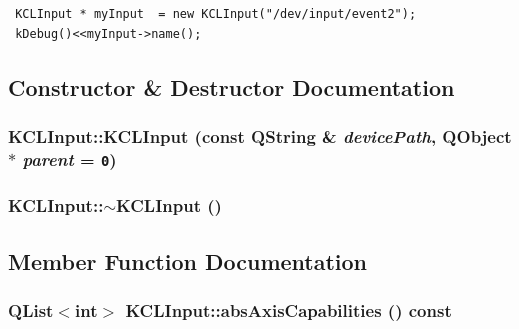 \begin{Code}\begin{verbatim} KCLInput * myInput  = new KCLInput("/dev/input/event2");
 kDebug()<<myInput->name();
\end{verbatim}
\end{Code}

 

\subsection{Constructor \& Destructor Documentation}
\hypertarget{class_k_c_l_input_27a074543e1f0f6d0ce92a40bceed684}{
\subsubsection[{KCLInput}]{\setlength{\rightskip}{0pt plus 5cm}KCLInput::KCLInput (const QString \& {\em devicePath}, \/  QObject $\ast$ {\em parent} = {\tt 0})}}
\label{class_k_c_l_input_27a074543e1f0f6d0ce92a40bceed684}


\hypertarget{class_k_c_l_input_aea38929accc31d9f27c08b5d4119fe3}{
\subsubsection[{$\sim$KCLInput}]{\setlength{\rightskip}{0pt plus 5cm}KCLInput::$\sim$KCLInput ()}}
\label{class_k_c_l_input_aea38929accc31d9f27c08b5d4119fe3}




\subsection{Member Function Documentation}
\hypertarget{class_k_c_l_input_98e8b6035165b8ba1d2eed1620cf1b1c}{
\subsubsection[{absAxisCapabilities}]{\setlength{\rightskip}{0pt plus 5cm}QList$<$int$>$ KCLInput::absAxisCapabilities () const}}
\label{class_k_c_l_input_98e8b6035165b8ba1d2eed1620cf1b1c}


